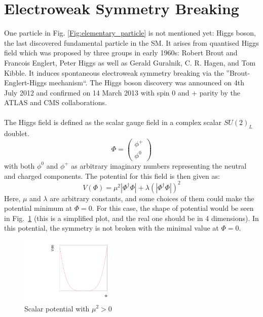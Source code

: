 \section{Electroweak Symmetry Breaking}
One particle in Fig. \ref{Fig:elementary_particle} is not mentioned yet: Higgs boson, the last discovered fundamental particle in the SM. It arises from quantised Higgs field which was proposed by three groups in early 1960s:  Robert Brout and Francois Englert\cite{Englert}, Peter Higgs\cite{Higgs} as well as Gerald Guralnik, C. R. Hagen, and Tom Kibble\cite{Hagen}. It induces spontaneous electroweak symmetry breaking via the ''Brout-Englert-Higgs mechanism``.  The Higgs boson discovery was announced on 4th July 2012 and confirmed on 14 March 2013 with spin 0 and $+$ parity by the ATLAS and CMS collaborations.
\\
\\The Higgs field is defined as the scalar gauge field in a complex scalar $SU(2)_L$ doublet.
\begin{equation}
 \Phi= \left(  \begin{array}{ c } \phi^+\\  \phi^0 \end{array} \right) 
\end{equation}
with both $\phi^0$ and $\phi^+$ as arbitrary imaginary numbers representing the neutral and charged components. The potential for this field is then given as:
\begin{equation}
 V(\Phi)=\mu^2|\Phi^\dagger\Phi|+\lambda(|\Phi^\dagger\Phi|)^2
\label{Eq:sm_higgs_potential}
\end{equation}
Here, $\mu$ and $\lambda$ are arbitrary constants, and some choices of them could make the potential minimum at $\Phi = 0$. For this case, the shape of potential would be seen in Fig.~\ref{Fig:V} (this is a simplified plot, and the real one should be in 4 dimensions). In this potential, the symmetry is not broken with the minimal value at $\Phi = 0$.
\\ 
\begin{figure}[!h]                
	\includegraphics[width=0.4\textwidth]{Chapter1/V.pdf}
	\centering
	\begin{center}
		\caption{Scalar potential with $\mu^2 > 0$}
		\label{Fig:V}            
	\end{center}
\end{figure}
